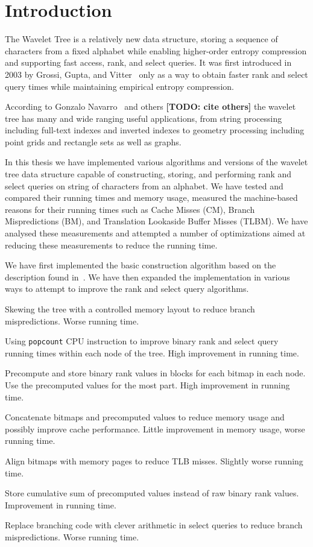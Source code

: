 \section{Introduction}
The Wavelet Tree is a relatively new data structure, storing a sequence of characters from a fixed alphabet while enabling higher-order entropy compression and supporting fast access, rank, and select queries. It was first introduced in 2003 by Grossi, Gupta, and Vitter~\cite[Section 4.2]{Grossi:2003:HET:644108.644250} only as a way to obtain faster rank and select query times while maintaining empirical entropy compression.

According to Gonzalo Navarro~\cite{Navjda13} and others \textbf{[TODO: cite others]} the wavelet tree has many and wide ranging useful applications, from string processing including full-text indexes and inverted indexes to geometry processing including point grids and rectangle sets as well as graphs.

In this thesis we have implemented various algorithms and versions of the wavelet tree data structure capable of constructing, storing, and performing rank and select queries on string of characters from an alphabet. We have tested and compared their running times and memory usage, measured the machine-based reasons for their running times such as Cache Misses (CM), Branch Mispredictions (BM), and Translation Lookaside Buffer Misses (TLBM). We have analysed these measurements and attempted a number of optimizations aimed at reducing these measurements to reduce the running time.

We have first implemented the basic construction algorithm based on the description found in~\citep[Section 2]{Navjda13}.
We have then expanded the implementation in various ways to attempt to improve the rank and select query algorithms.
\begin{description*}
\item[Skewing the tree] with a controlled memory layout to reduce branch mispredictions. Worse running time.
\item[Using \texttt{popcount} CPU instruction] to improve binary rank and select query running times within each node of the tree. High improvement in running time.
\item[Precompute and store binary rank values] in blocks for each bitmap in each node. Use the precomputed values for the most part. High improvement in running time.
\item[Concatenate bitmaps and precomputed values] to reduce memory usage and possibly improve cache performance. Little improvement in memory usage, worse running time.
\item[Align bitmaps with memory pages] to reduce TLB misses. Slightly worse running time.
\item[Store cumulative sum of precomputed values] instead of raw binary rank values. Improvement in running time.
\item[Replace branching code with clever arithmetic] in select queries to reduce branch mispredictions. Worse running time.
\end{description*}

